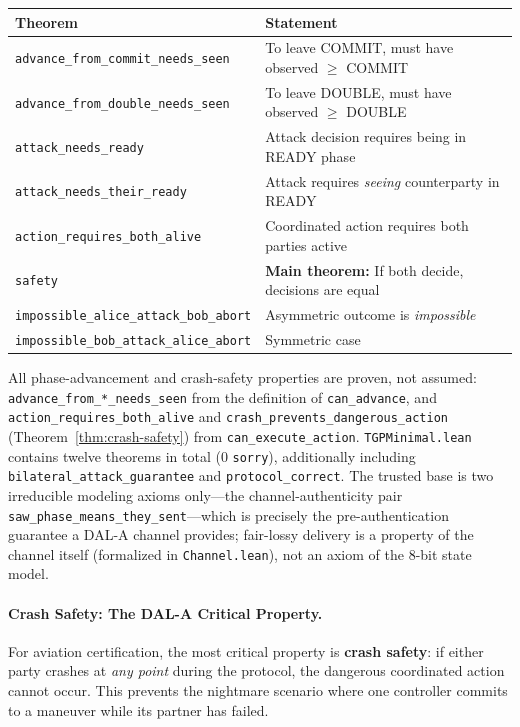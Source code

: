 \begin{center}
\begin{tabular}{lp{7.5cm}}
\toprule
\textbf{Theorem} & \textbf{Statement} \\
\midrule
\texttt{advance\_from\_commit\_needs\_seen} & To leave COMMIT, must have observed $\geq$ COMMIT \\
\texttt{advance\_from\_double\_needs\_seen} & To leave DOUBLE, must have observed $\geq$ DOUBLE \\
\texttt{attack\_needs\_ready} & Attack decision requires being in READY phase \\
\texttt{attack\_needs\_their\_ready} & Attack requires \emph{seeing} counterparty in READY \\
\texttt{action\_requires\_both\_alive} & Coordinated action requires both parties active \\
\texttt{safety} & \textbf{Main theorem:} If both decide, decisions are equal \\
\texttt{impossible\_alice\_attack\_bob\_abort} & Asymmetric outcome is \emph{impossible} \\
\texttt{impossible\_bob\_attack\_alice\_abort} & Symmetric case \\
\bottomrule
\end{tabular}
\end{center}

All phase-advancement and crash-safety properties are proven, not assumed: \texttt{advance\_from\_*\_needs\_seen} from the definition of \texttt{can\_advance}, and \texttt{action\_requires\_both\_alive} and \texttt{crash\_prevents\_dangerous\_action} (Theorem~\ref{thm:crash-safety}) from \texttt{can\_execute\_action}. \texttt{TGPMinimal.lean} contains twelve theorems in total (0 \texttt{sorry}), additionally including \texttt{bilateral\_attack\_guarantee} and \texttt{protocol\_correct}. The trusted base is two irreducible modeling axioms only---the channel-authenticity pair \texttt{saw\_phase\_means\_they\_sent}---which is precisely the pre-authentication guarantee a DAL-A channel provides; fair-lossy delivery is a property of the channel itself (formalized in \texttt{Channel.lean}), not an axiom of the 8-bit state model.

\paragraph{Crash Safety: The DAL-A Critical Property.}
For aviation certification, the most critical property is \textbf{crash safety}: if either party crashes at \emph{any point} during the protocol, the dangerous coordinated action cannot occur. This prevents the nightmare scenario where one controller commits to a maneuver while its partner has failed.


